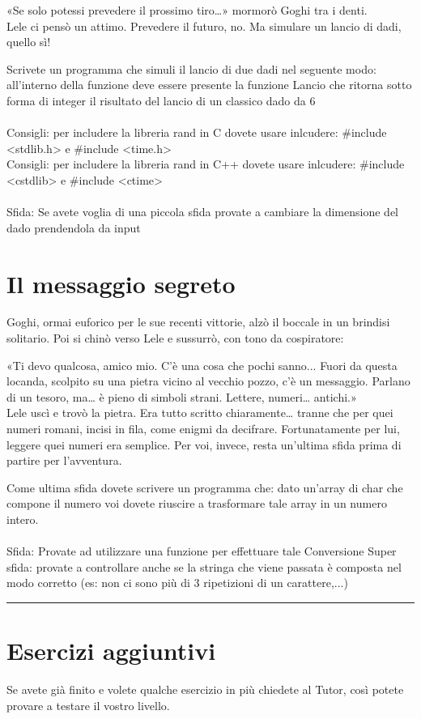 \documentclass[a4paper]{article}
\begin{document}
«Se solo potessi prevedere il prossimo tiro…» mormorò Goghi tra i denti.\\
Lele ci pensò un attimo. Prevedere il futuro, no. Ma simulare un lancio di dadi, quello sì!

Scrivete un programma che simuli il lancio di due dadi nel seguente modo: all'interno della funzione deve essere presente la funzione Lancio che ritorna sotto forma di integer il risultato del lancio di un classico dado da 6\\
\\
Consigli: per includere la libreria rand in C dovete usare inlcudere: \#include <stdlib.h> e \#include <time.h>\\
Consigli: per includere la libreria rand in C++ dovete usare inlcudere: \#include <cstdlib> e \#include <ctime>\\
\\
Sfida: Se avete voglia di una piccola sfida provate a cambiare la dimensione del dado prendendola da input

\section*{Il messaggio segreto}
Goghi, ormai euforico per le sue recenti vittorie, alzò il boccale in un brindisi solitario. Poi si chinò verso Lele e sussurrò, con tono da cospiratore:

«Ti devo qualcosa, amico mio. C’è una cosa che pochi sanno... Fuori da questa locanda, scolpito su una pietra vicino al vecchio pozzo, c’è un messaggio. Parlano di un tesoro, ma… è pieno di simboli strani. Lettere, numeri… antichi.»\\
Lele uscì e trovò la pietra. Era tutto scritto chiaramente… tranne che per quei numeri romani, incisi in fila, come enigmi da decifrare.
Fortunatamente per lui, leggere quei numeri era semplice. Per voi, invece, resta un’ultima sfida prima di partire per l’avventura.

Come ultima sfida dovete scrivere un programma che: dato un'array di char che compone il numero voi dovete riuscire a trasformare tale array in un numero intero.\\
\\
Sfida: Provate ad utilizzare una funzione per effettuare tale Conversione
Super sfida: provate a controllare anche se la stringa che viene passata è composta nel modo corretto (es: non ci sono più di 3 ripetizioni di un carattere,...)

\noindent\rule{\linewidth}{0.4pt}
\section*{Esercizi aggiuntivi}
Se avete già finito e volete qualche esercizio in più chiedete al Tutor, così potete provare a testare il vostro livello.
\end{document}

